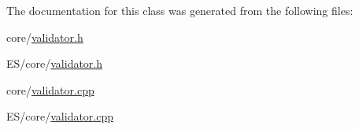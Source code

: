 The documentation for this class was generated from the following files:\begin{DoxyCompactItemize}
\item 
core/\hyperlink{core_2validator_8h}{validator.h}\item 
ES/core/\hyperlink{_e_s_2core_2validator_8h}{validator.h}\item 
core/\hyperlink{core_2validator_8cpp}{validator.cpp}\item 
ES/core/\hyperlink{_e_s_2core_2validator_8cpp}{validator.cpp}\end{DoxyCompactItemize}
